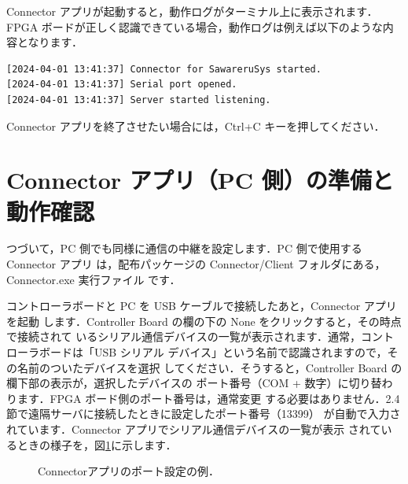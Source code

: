 Connector アプリが起動すると，動作ログがターミナル上に表示されます．FPGA
ボードが正しく認識できている場合，動作ログは例えば以下のような内容となります．
\begin{verbatim}
[2024-04-01 13:41:37] Connector for SawareruSys started.
[2024-04-01 13:41:37] Serial port opened.
[2024-04-01 13:41:37] Server started listening.
\end{verbatim}
Connector アプリを終了させたい場合には，Ctrl+C キーを押してください．

\section{Connector アプリ（PC 側）の準備と動作確認}

つづいて，PC 側でも同様に通信の中継を設定します．PC 側で使用する Connector アプリ
は，配布パッケージの Connector/Client フォルダにある，Connector.exe 実行ファイル
です．

コントローラボードと PC を USB ケーブルで接続したあと，Connector アプリを起動
します．Controller Board の欄の下の None をクリックすると，その時点で接続されて
いるシリアル通信デバイスの一覧が表示されます．通常，コントローラボードは「USB
シリアル デバイス」という名前で認識されますので，その名前のついたデバイスを選択
してください．そうすると，Controller Board の欄下部の表示が，選択したデバイスの
ポート番号（COM + 数字）に切り替わります．FPGA ボード側のポート番号は，通常変更
する必要はありません．2.4節で遠隔サーバに接続したときに設定したポート番号（13399）
が自動で入力されています．Connector アプリでシリアル通信デバイスの一覧が表示
されているときの様子を，図\ref{fig:connector_port}に示します．

\begin{figure}[ht]
 \centering
 \caption{Connectorアプリのポート設定の例．}
 \label{fig:connector_port}
\end{figure}

